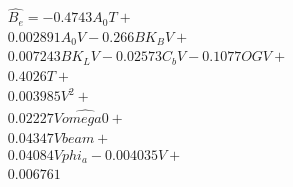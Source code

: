 \begin{equation} \label{eq:polynom_complex}
\begin{aligned} 
 \hat{B_{e}} = - 0.4743 A_{0} T + \\ 
 0.002891 A_{0} V - 0.266 BK_{B} V + \\ 
 0.007243 BK_{L} V - 0.02573 C_{b} V - 0.1077 OG V + \\ 
 0.4026 T + \\ 
 0.003985 V^{2} + \\ 
 0.02227 V \hat{omega0} + \\ 
 0.04347 V beam + \\ 
 0.04084 V phi_{a} - 0.004035 V + \\ 
 0.006761 \\ 
 \end{aligned}
\end{equation}
